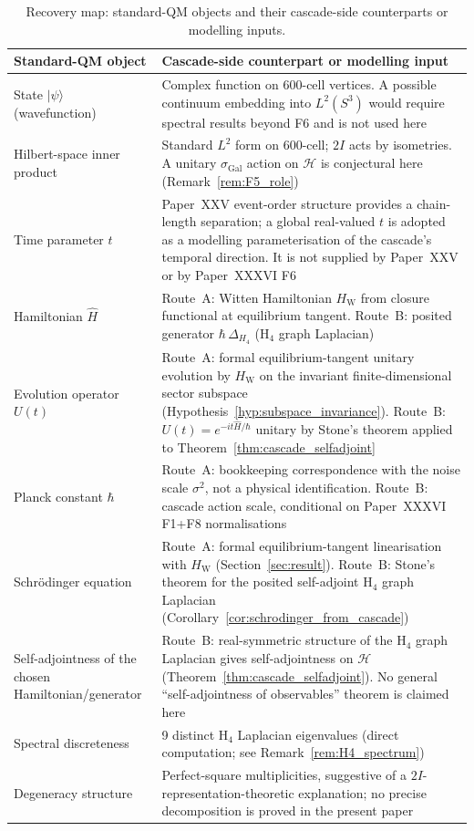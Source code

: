 \documentclass[12pt]{article}
\newcommand{\HW}{H_{\mathrm{W}}}
\newcommand{\twoI}{2I}
\newcommand{\sigmaG}{\sigma_{\mathrm{Gal}}}
\begin{document}
\begin{table}[ht]
\centering
\caption{Recovery map: standard-QM objects and their cascade-side counterparts or modelling inputs.}
\label{tab:recovery_qm}
\begin{tabular}{@{}p{5cm}p{8cm}@{}}
\toprule
Standard-QM object & Cascade-side counterpart or modelling input \\
\midrule
State $|\psi\rangle$ (wavefunction) & Complex function on 600-cell vertices. A possible continuum embedding into $L^2(S^3)$ would require spectral results beyond F6 and is not used here \\
Hilbert-space inner product & Standard $L^2$ form on 600-cell; $\twoI$ acts by isometries. A unitary $\sigmaG$ action on $\mathcal{H}$ is conjectural here (Remark~\ref{rem:F5_role}) \\
Time parameter $t$ & Paper~XXV event-order structure provides a chain-length separation; a global real-valued $t$ is adopted as a modelling parameterisation of the cascade's temporal direction. It is not supplied by Paper~XXV or by Paper~XXXVI F6 \\
Hamiltonian $\hat H$ & Route~A: Witten Hamiltonian $\HW$ from closure functional at equilibrium tangent. Route~B: posited generator $\hbar\,\Delta_{H_4}$ (H${}_4$ graph Laplacian) \\
Evolution operator $U(t)$ & Route~A: formal equilibrium-tangent unitary evolution by $\HW$ on the invariant finite-dimensional sector subspace (Hypothesis~\ref{hyp:subspace_invariance}). Route~B: $U(t) = e^{-it\hat H/\hbar}$ unitary by Stone's theorem applied to Theorem~\ref{thm:cascade_selfadjoint} \\
Planck constant $\hbar$ & Route~A: bookkeeping correspondence with the noise scale $\sigma^2$, not a physical identification. Route~B: cascade action scale, conditional on Paper~XXXVI F1+F8 normalisations \\
Schr\"odinger equation & Route~A: formal equilibrium-tangent linearisation with $\HW$ (Section~\ref{sec:result}). Route~B: Stone's theorem for the posited self-adjoint H${}_4$ graph Laplacian (Corollary~\ref{cor:schrodinger_from_cascade}) \\
Self-adjointness of the chosen Hamiltonian/generator & Route~B: real-symmetric structure of the H${}_4$ graph Laplacian gives self-adjointness on $\mathcal{H}$ (Theorem~\ref{thm:cascade_selfadjoint}). No general ``self-adjointness of observables'' theorem is claimed here \\
Spectral discreteness & 9 distinct H${}_4$ Laplacian eigenvalues (direct computation; see Remark~\ref{rem:H4_spectrum}) \\
Degeneracy structure & Perfect-square multiplicities, suggestive of a $\twoI$-representation-theoretic explanation; no precise decomposition is proved in the present paper \\
\bottomrule
\end{tabular}
\end{table}
\end{document}
